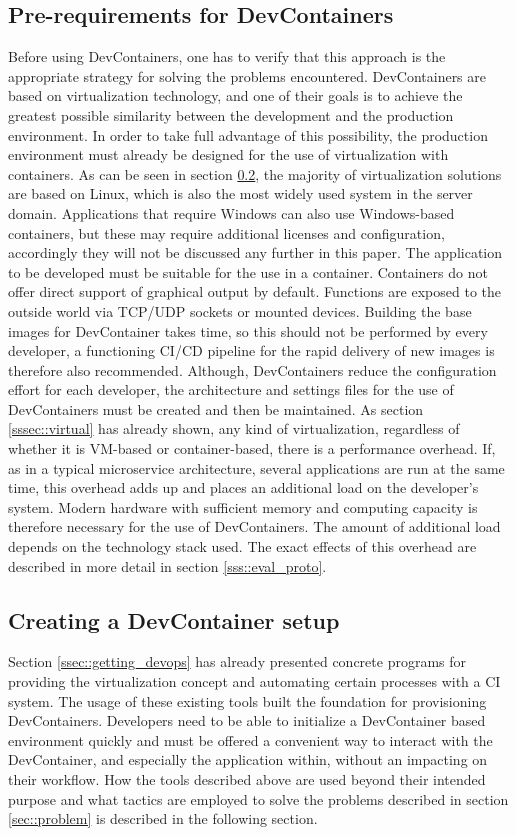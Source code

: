     \subsection{Pre-requirements for DevContainers}
    Before using DevContainers, one has to verify that this approach is the appropriate strategy for solving the problems encountered. DevContainers are based on virtualization technology, and one of their goals is to achieve the greatest possible similarity between the development and the production environment. In order to take full advantage of this possibility, the production environment must already be designed for the use of virtualization with containers. As can be seen in section \ref{ssec::toolsused}, the majority of virtualization solutions are based on Linux, which is also the most widely used system in the server domain. Applications that require Windows can also use Windows-based containers, but these may require additional licenses and configuration, accordingly they will not be discussed any further in this paper. The application to be developed must be suitable for the use in a container. Containers do not offer direct support of graphical output by default. Functions are exposed to the outside world via TCP/UDP sockets or mounted devices. Building the base images for DevContainer takes time, so this should not be performed by every developer, a functioning \ac{CI}/\ac{CD} pipeline for the rapid delivery of new images is therefore also recommended.\newline
    Although, DevContainers reduce the configuration effort for each developer, the architecture and settings files for the use of DevContainers must be created and then be maintained. As section \ref{sssec::virtual} has already shown, any kind of virtualization, regardless of whether it is VM-based or container-based, there is a performance overhead. If, as in a typical microservice architecture, several applications are run at the same time, this overhead adds up and places an additional load on the developer's system. Modern hardware with sufficient memory and computing capacity is therefore necessary for the use of DevContainers. The amount of additional load depends on the technology stack used. The exact effects of this overhead are described in more detail in section \ref{sss::eval_proto}.

    \subsection{Creating a DevContainer setup}\label{ssec::toolsused}
    Section \ref{ssec::getting_devops} has already presented concrete programs for providing the virtualization concept and automating certain processes with a \ac{CI} system. The usage of these existing tools built the foundation for provisioning DevContainers. Developers need to be able to initialize a DevContainer based environment quickly and must be offered a convenient way to interact with the DevContainer, and especially the application within, without an impacting on their workflow. How the tools described above are used beyond their intended purpose and what tactics are employed to solve the problems described in section \ref{sec::problem} is described in the following section.

